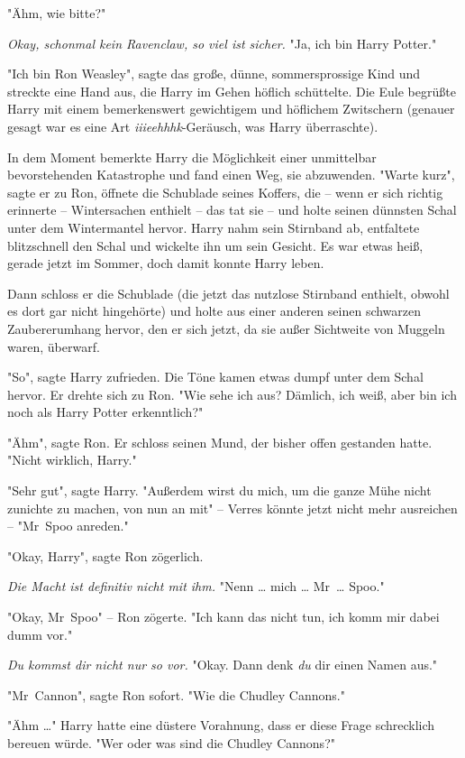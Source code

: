 {"Ähm, wie bitte?"

\emph{Okay, schonmal kein Ravenclaw, so viel ist sicher.} "Ja, ich bin Harry Potter."

"Ich bin Ron Weasley", sagte das große, dünne, sommersprossige Kind und streckte eine Hand aus, die Harry im Gehen höflich schüttelte. Die Eule begrüßte Harry mit einem bemerkenswert gewichtigem und höflichem Zwitschern (genauer gesagt war es eine Art \emph{iiieehhhk}-Geräusch, was Harry überraschte).

In dem Moment bemerkte Harry die Möglichkeit einer unmittelbar bevorstehenden Katastrophe und fand einen Weg, sie abzuwenden. "Warte kurz", sagte er zu Ron, öffnete die Schublade seines Koffers, die -- wenn er sich richtig erinnerte -- Wintersachen enthielt -- das tat sie -- und holte seinen dünnsten Schal unter dem Wintermantel hervor. Harry nahm sein Stirnband ab, entfaltete blitzschnell den Schal und wickelte ihn um sein Gesicht. Es war etwas heiß, gerade jetzt im Sommer, doch damit konnte Harry leben.

Dann schloss er die Schublade (die jetzt das nutzlose Stirnband enthielt, obwohl es dort gar nicht hingehörte) und holte aus einer anderen seinen schwarzen Zaubererumhang hervor, den er sich jetzt, da sie außer Sichtweite von Muggeln waren, überwarf.

"So", sagte Harry zufrieden. Die Töne kamen etwas dumpf unter dem Schal hervor. Er drehte sich zu Ron. "Wie sehe ich aus? Dämlich, ich weiß, aber bin ich noch als Harry Potter erkenntlich?"

"Ähm", sagte Ron. Er schloss seinen Mund, der bisher offen gestanden hatte. "Nicht wirklich, Harry."

"Sehr gut", sagte Harry. "Außerdem wirst du mich, um die ganze Mühe nicht zunichte zu machen, von nun an mit" -- Verres könnte jetzt nicht mehr ausreichen -- "Mr~Spoo anreden."

"Okay, Harry", sagte Ron zögerlich.

\emph{Die Macht ist definitiv nicht mit ihm.} "Nenn … mich … Mr~… Spoo."

"Okay, Mr~Spoo" -- Ron zögerte. "Ich kann das nicht tun, ich komm mir dabei dumm vor."

\emph{Du kommst dir nicht nur so vor.} "Okay. Dann denk \emph{du} dir einen Namen aus."

"Mr~Cannon", sagte Ron sofort. "Wie die Chudley Cannons."

"Ähm …" Harry hatte eine düstere Vorahnung, dass er diese Frage schrecklich bereuen würde. "Wer oder was sind die Chudley Cannons?"

}
